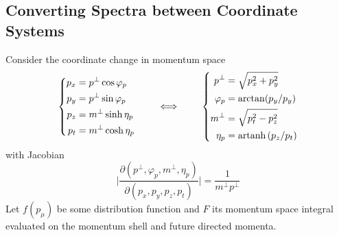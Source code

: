 \subsection{Converting Spectra between Coordinate Systems}

Consider the coordinate change in momentum space
\begin{equation}
    \left\{
    \begin{split}
        p_x&=p^\perp\cos\varphi_p\\
        p_y&=p^\perp\sin\varphi_p\\
        p_z&=m^\perp\sinh\eta_p\\
        p_t&=m^\perp\cosh\eta_p
    \end{split}
    \right.\qquad\iff\qquad
    \left\{
    \begin{split}
        p^\perp&=\sqrt{p_x^2+p_y^2}\\
        \varphi_p&=\arctan(p_y/p_y)\\
        m^\perp&=\sqrt{p_t^2-p_z^2}\\
        \eta_p&={\text{artanh}\,}(p_z/p_t)
    \end{split}
    \right.
\end{equation}
with Jacobian
\begin{equation}
    \big\vert\frac{\partial(p^\perp,\varphi_p,m^\perp,\eta_p)}{\partial(p_x,p_y,p_z,p_t)}\big\vert=\frac{1}{m^\perp p^\perp}
\end{equation}
Let $f(p_\mu)$ be some distribution function and $F$ its momentum space integral evaluated on the momentum shell and future directed momenta.

